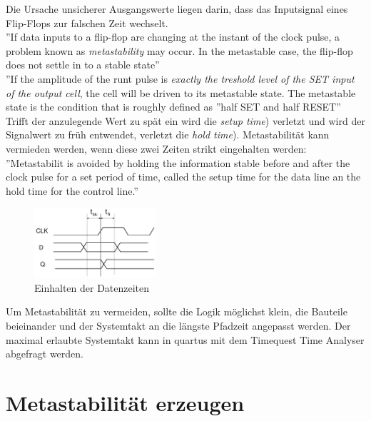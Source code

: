 Die Ursache unsicherer Ausgangswerte liegen darin, dass das Inputsignal eines Flip-Flops zur falschen Zeit wechselt. \\
\newline
''If data inputs to a flip-flop are changing at the instant of the clock pulse, a problem known as \textit{metastability} may occur. In the metastable case, the flip-flop does not settle in to a stable state'' \cite{ReferenceManual} \\
\newline
''If the amplitude of the runt pulse is \textit{exactly the treshold level of the SET input of the output cell}, the cell will be driven to its metastable state. The metastable state is the condition that is roughly defined as ''half SET and half RESET'' \cite{F_metastability}\\
\newpage
Trifft der anzulegende Wert zu spät ein wird die \textit{setup time}) verletzt und wird der Signalwert zu früh entwendet, verletzt die \textit{hold time}). Metastabilität kann vermieden werden, wenn diese zwei Zeiten strikt eingehalten werden:\\
\newline
''Metastabilit is avoided by holding the information stable before and after the clock pulse  for a set period of time, called the setup time for the data line an the hold time for the control line.''\cite{ReferenceManual}
\begin{figure}[H]
	\centering
	\includegraphics[width=0.4\textwidth]{images/metastability/kritscheZeit_FF.png}
	\caption{Einhalten der Datenzeiten}
	\label{fig.metastabil.kritisches_zeitfenster}
\end{figure}

Um Metastabilität zu vermeiden, sollte die Logik möglichst klein, die Bauteile beieinander und der Systemtakt an die längste Pfadzeit angepasst werden. Der maximal erlaubte Systemtakt kann in quartus mit dem Timequest Time Analyser abgefragt werden.\\


\section{Metastabilität erzeugen}\label{sect.meatastabil_erzeugen}

